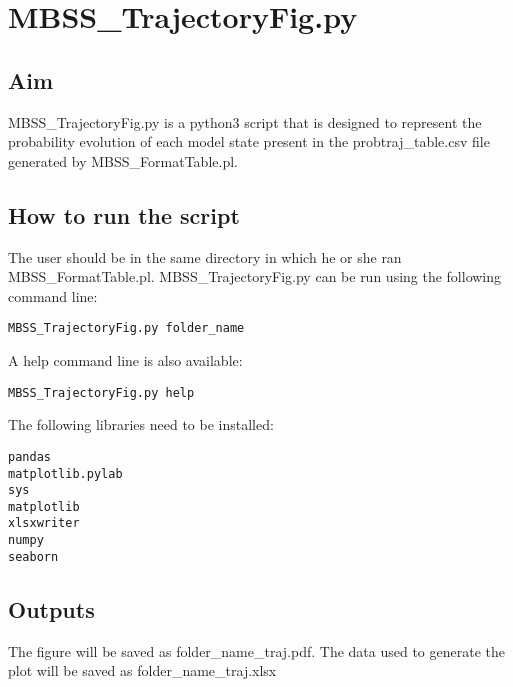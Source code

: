 \documentclass{article}
\begin{document}
\section*{MBSS\_TrajectoryFig.py}
\subsection*{Aim}
MBSS\_TrajectoryFig.py is a python3 script that is designed to represent the probability evolution of each model state present in the probtraj\_table.csv file generated by MBSS\_FormatTable.pl. 

\subsection*{How to run the script}
The user should be in the same directory in which he or she ran MBSS\_FormatTable.pl. MBSS\_TrajectoryFig.py can be run using the following command line: 
\begin{verbatim}
MBSS_TrajectoryFig.py folder_name
\end{verbatim}
 A help command line is also available:
\begin{verbatim} 
MBSS_TrajectoryFig.py help
\end{verbatim}
The following libraries need to be installed:
\begin{verbatim}
pandas
matplotlib.pylab
sys
matplotlib
xlsxwriter
numpy
seaborn
\end{verbatim}


\subsection*{Outputs}
The figure will be saved as folder\_name\_traj.pdf.
The data used to generate the plot will be saved as folder\_name\_traj.xlsx
\end{document}

